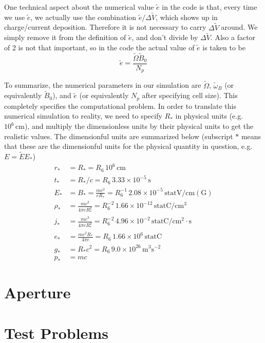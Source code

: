 One technical aspect about the numerical value $\tilde{e}$ in the code is that,
every time we use $\tilde{e}$, we actually use the combination $\tilde{e}/\Delta
\tilde{V}$, which shows up in charge/current deposition. Therefore it is not
necessary to carry $\Delta \tilde{V}$ around. We simply remove it from the
definition of $\tilde{e}$, and don't divide by $\Delta \tilde{V}$. Also a factor
of 2 is not that important, so in the code the actual value of $\tilde{e}$ is
taken to be
\begin{equation}
    \tilde{e} = \frac{\tilde{\Omega} \tilde{B}_0}{N_{p}}
\end{equation}

To summarize, the numerical parameters in our simulation are $\tilde{\Omega}$,
$\tilde{\omega}_B$ (or equivalently $\tilde{B}_{0}$), and $\tilde{e}$ (or
equivalently $N_p$ after specifying cell size). This completely specifies the
computational problem. In order to translate this numerical simulation to
reality, we need to specify $R_{*}$ in physical units (e.g.\ $10^6\,
\mathrm{cm}$), and multiply the dimensionless units by their physical units to
get the realistic values. The dimensionful units are summarized below (subscript
$*$ means that these are the dimensionful units for the physical quantity in
question, e.g.\ $E = \tilde{E} E_*$)
\begin{align}
  r_{*} &= R_{*} = R_6\, 10^6\, \mathrm{cm} \\
  t_{*} &= R_{*} / c = R_6\,3.33\times 10^{-5}\, \mathrm{s} \\
  E_{*} &= B_{*} = \frac{mc^2}{eR_{*}} = R_6^{-1}\, 2.08\times 10^{-5}\, \mathrm{statV/cm(G)} \\
  \rho_{*} &= \frac{mc^2}{4\pi eR_{*}^2} = R_{6}^{-2}\, 1.66\times 10^{-12}\, \mathrm{statC/cm^3} \\
  j_{*} &= \frac{mc^3}{4\pi eR_{*}^2} = R_{6}^{-2}\, 4.96\times 10^{-2}\, \mathrm{statC/cm^2\cdot s}  \\
  e_{*} &= \frac{mc^2R_{*}}{4\pi e} = R_6\, 1.66\times 10^6\, \mathrm{statC} \\
  g_{*} &= R_{*}c^2 = R_6\, 9.0\times 10^{26}\, \mathrm{m^3s^{-2}} \\
  p_{*} &= mc
\end{align}

\section{Aperture}

\section{Test Problems}
\label{sec:test-problems}

